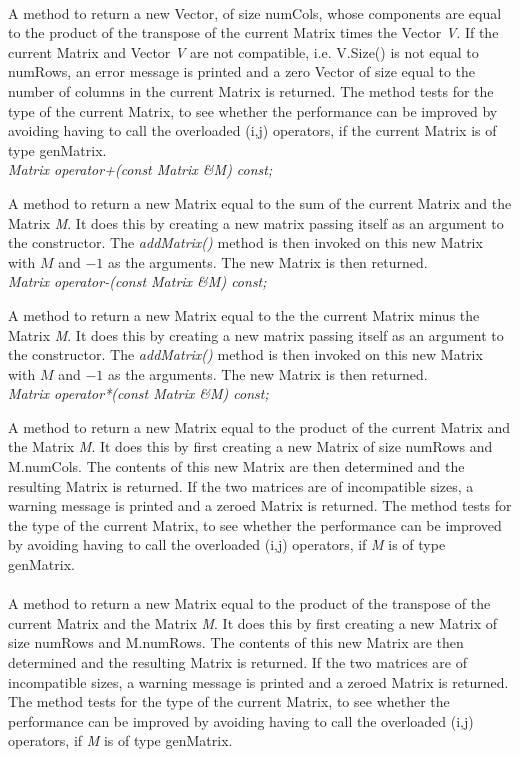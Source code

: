  \\ 
A method to return a new Vector, of size numCols, whose components are
equal to the product of the transpose of the current Matrix times the
Vector {\em V}. If the current Matrix and Vector {\em V} are not
compatible, i.e. V.Size() is not equal to numRows, an error message is
printed and a zero Vector of size equal to the number of columns in
the current Matrix is returned. The method tests for the type of the
current Matrix, to see whether the performance can be improved by
avoiding having to call the overloaded (i,j) operators, if the current
Matrix is of type genMatrix. \\ 

{\em Matrix operator+(const Matrix \&M) const;} 

A method to return a new Matrix equal to the sum of the current Matrix
and the Matrix {\em M}. It does this by creating a new matrix passing
itself as an argument to the constructor. The {\em addMatrix()} method
is then invoked on this new Matrix with $M$ and $-1$ as the
arguments. The new Matrix is then returned. \\ 

{\em Matrix operator-(const Matrix \&M) const;} 

A method to return a new Matrix equal to the the current Matrix minus
the Matrix {\em M}. It does this by creating a new matrix passing
itself as an argument to the constructor. The {\em addMatrix()} method
is then invoked on this new Matrix with $M$ and $-1$ as the
arguments. The new Matrix is then returned. \\ 

{\em Matrix operator*(const Matrix \&M) const;} 

A method to return a new Matrix equal to the product of the current
Matrix and the Matrix {\em M}. It does this by first creating a new
Matrix of size numRows and M.numCols. The contents of this new Matrix
are then determined and the resulting Matrix is returned. If the two
matrices are of incompatible sizes, a warning message is printed and a
zeroed Matrix is returned. The method tests for the type of the
current Matrix, to see whether the performance can be improved by
avoiding having to call the overloaded (i,j) operators, if {\em M} 
is of type genMatrix. \\

 \\ 
A method to return a new Matrix equal to the product of the transpose
of the current Matrix and the Matrix {\em M}. It does this by first
creating a new Matrix of size numRows and M.numRows. The contents of
this new Matrix are then determined and the resulting Matrix is
returned. If the two matrices are of incompatible sizes, a warning
message is printed and a zeroed Matrix is returned. The method tests
for the type of the current Matrix, to see whether the performance can
be improved by avoiding having to call the overloaded (i,j) operators,
if {\em M} is of type genMatrix. \\

